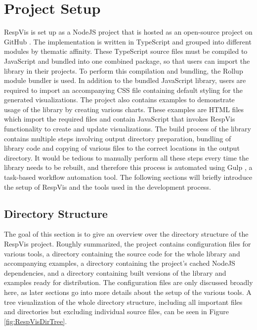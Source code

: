 \section{Project Setup}
\label{sec:ProjectSetup}

RespVis is set up as a NodeJS \parencite{NodeJS} project that is hosted as an open-source project on GitHub \parencite{RespVisGitHub}.
The implementation is written in TypeScript and grouped into different modules by thematic affinity. 
These TypeScript source files must be compiled to JavaScript and bundled into one combined package, so that users can import the library in their projects.
To perform this compilation and bundling, the Rollup module bundler \parencite{Rollup} is used.
In addition to the bundled JavaScript library, users are required to import an accompanying CSS file containing default styling for the generated visualizations.
The project also contains examples to demonstrate usage of the library by creating various charts.
These examples are HTML files which import the required files and contain JavaScript that invokes RespVis functionality to create and update visualizations.
The build process of the library contains multiple steps involving output directory preparation, bundling of library code and copying of various files to the correct locations in the output directory.
It would be tedious to manually perform all these steps every time the library needs to be rebuilt, and therefore this process is automated using Gulp \parencite{Gulp}, a task-based workflow automation tool.
The following sections will briefly introduce the setup of RespVis and the tools used in the development process.  

\subsection{Directory Structure}

The goal of this section is to give an overview over the directory structure of the RespVis project.
Roughly summarized, the project contains configuration files for various tools, a  directory containing the source code for the whole library and accompanying examples, a  directory containing the project's cached NodeJS dependencies, and a  directory containing built versions of the library and examples ready for distribution.
The configuration files are only discussed broadly here, as later sections go into more details about the setup of the various tools.
A tree visualization of the whole directory structure, including all important files and directories but excluding individual source files, can be seen in Figure \ref{fig:RespVisDirTree}.


